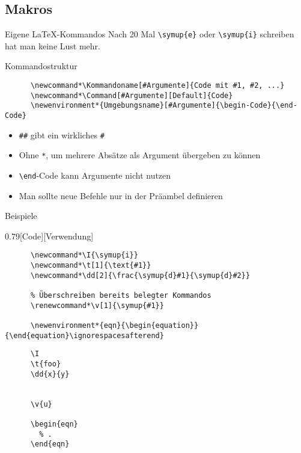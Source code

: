 \subsection{Makros}

\begin{frame}[fragile]{Eigene \LaTeX-Kommandos}
  Nach 20 Mal \lstinline+\symup{e}+ oder \lstinline+\symup{i}+ schreiben hat man keine Lust mehr.
  \vspace{1em}
  \begin{block}{Kommandostruktur}
    \begin{lstlisting}
      \newcommand*\Kommandoname[#Argumente]{Code mit #1, #2, ...}
      \newcommand*\Command[#Argumente][Default]{Code}
      \newenvironment*{Umgebungsname}[#Argumente]{\begin-Code}{\end-Code}
    \end{lstlisting}
  \end{block}
  \begin{itemize}
    \item \verb+##+ gibt ein wirkliches \verb+#+
    \item Ohne \texttt{*}, um mehrere Absätze als Argument übergeben zu können
    \item \lstinline+\end+-Code kann Argumente nicht nutzen
    \item Man sollte neue Befehle nur in der Präambel definieren
  \end{itemize}
\end{frame}

\begin{frame}[fragile]{Beispiele}
  \begin{CodeExample}{0.79}[Code][Verwendung]
    \begin{lstlisting}
      \newcommand*\I{\symup{i}}
      \newcommand*\t[1]{\text{#1}}
      \newcommand*\dd[2]{\frac{\symup{d}#1}{\symup{d}#2}}

      % Überschreiben bereits belegter Kommandos
      \renewcommand*\v[1]{\symup{#1}}

      \newenvironment*{eqn}{\begin{equation}}{\end{equation}\ignorespacesafterend}
    \end{lstlisting}
  \CodeResult
    \begin{lstlisting}
      \I
      \t{foo}
      \dd{x}{y}


      \v{u}

      \begin{eqn}
        % .
      \end{eqn}
    \end{lstlisting}
  \end{CodeExample}
\end{frame}

